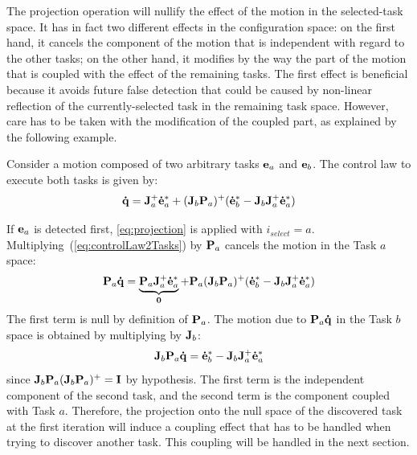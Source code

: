 \documentclass[journal]{IEEEtran}
\begin{document}
The projection operation will nullify the effect of the motion in the
selected-task space. It has in fact two different effects in the configuration
space: on the first hand, it cancels the component of the motion that is
independent with regard to the other tasks; on the other hand, it modifies by
the way the part of the motion that is coupled with the effect of the remaining
tasks. The first effect is beneficial because it avoids future false
detection that could be caused by non-linear reflection of the
currently-selected task in the remaining task space. However, care has to be taken with the modification of the coupled part, as explained by the following example.

Consider a motion composed of two arbitrary tasks ${\mathbf{e}}_a$ and ${\mathbf{e}}_b$.
The control law to execute both tasks is given by:
\begin{equation}
  \mbf{\dot{q}} = \mbf{J}_a^+\mbf{\dot{e}}_a^* + (\mbf{J}_b\mbf{P}_a)^+ (\mbf{\dot{e}}_b^* - \mbf{J}_b\mbf{J}_a^+\mbf{\dot{e}}_a^*)
  \label{eq:controlLaw2Tasks}
\end{equation}

If ${\mathbf{e}}_a$ is detected first, \eqref{eq:projection} is applied with
$i_{select} = a$. Multiplying~(\ref{eq:controlLaw2Tasks}) by ${\mathbf{P}}_a$
cancels the motion in the Task $a$ space:
\begin{equation}
  \mbf{P}_a \mbf{\dot{q}} = \underbrace{\mbf{P}_a \mbf{J}_a^+\mbf{\dot{e}}_a^*}_{\mbf{0}} + \mbf{P}_a (\mbf{J}_b\mbf{P}_a)^+ (\mbf{\dot{e}}_b^* - \mbf{J}_b\mbf{J}_a^+\mbf{\dot{e}}_a^*)
  \label{eq:cancel1_2:1}
\end{equation}
The first term is null by definition of ${\mathbf{P}}_a$.
The motion due to ${\mathbf{P}}_a {\mathbf{\dot{q}}}$ in the Task $b$ space is obtained by multiplying by ${\mathbf{J}}_b$:
\begin{equation}
  \mbf{J}_b \mbf{P}_a \mbf{\dot{q}} = \mbf{\dot{e}}_b^* -
  \mbf{J}_b  \mbf{J}_a^+ \mbf{\dot{e}}_a^*
  \label{eq:J2P1q}
\end{equation}
since ${\mathbf{J}}_b{\mathbf{P}}_a({\mathbf{J}}_b{\mathbf{P}}_a)^+ = {\mathbf{I}}$ by hypothesis.
The first term is the
independent component of the second task, and the second term
is the component coupled with Task $a$.
Therefore, the projection onto the null space of the discovered task  at the
first iteration will induce a coupling effect that has to be handled when trying to discover another task.
This coupling will be handled in the next section.
\end{document}
